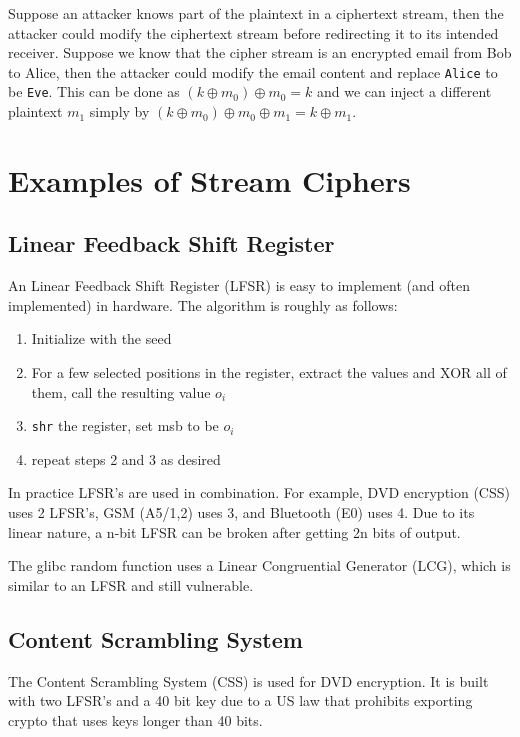 \documentclass{article}
\begin{document}
\begin{multicols}{2}
Suppose an attacker knows part of the plaintext in a ciphertext stream, then the attacker could modify the ciphertext stream before redirecting it to its intended receiver. Suppose we know that the cipher stream is an encrypted email from Bob to Alice, then the attacker could modify the email content and replace \texttt{Alice} to be \texttt{Eve}. This can be done as $(k \oplus m_0 ) \oplus m_0 = k$ and we can inject a different plaintext $m_1$ simply by $(k \oplus m_0 ) \oplus m_0 \oplus m_1 = k \oplus m_1$.

\section{Examples of Stream Ciphers}
\subsection{Linear Feedback Shift Register}

An Linear Feedback Shift Register (LFSR) is easy to implement (and often implemented) in hardware. The algorithm is roughly as follows:

\begin{enumerate}
    \item Initialize with the seed
    \item For a few selected positions in the register, extract the values and XOR all of them, call the resulting value $o_i$
    \item \texttt{shr} the register, set msb to be $o_i$
    \item repeat steps 2 and 3 as desired
\end{enumerate}

In practice LFSR's are used in combination. For example, DVD encryption (CSS) uses 2 LFSR's, GSM (A5/1,2) uses 3, and Bluetooth (E0) uses 4. Due to its linear nature, a n-bit LFSR can be broken after getting 2n bits of output. 

The glibc random function uses a Linear Congruential Generator (LCG), which is similar to an LFSR and still vulnerable.

\subsection{Content Scrambling System}

The Content Scrambling System (CSS) is used for DVD encryption. It is built with two LFSR's and a 40 bit key due to a US law that prohibits exporting crypto that uses keys longer than 40 bits.


\end{multicols}
\end{document}
